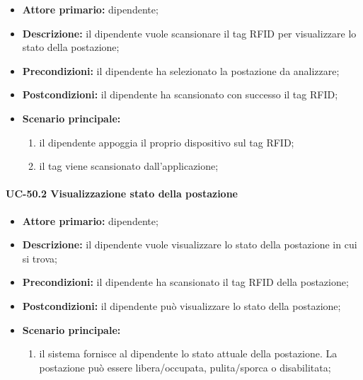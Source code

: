     \begin{itemize}
        \item \textbf{Attore primario:} dipendente;

        \item \textbf{Descrizione:} il dipendente vuole scansionare il tag RFID per visualizzare lo stato della postazione;

        \item \textbf{Precondizioni:} il dipendente ha selezionato la postazione da analizzare;

        \item \textbf{Postcondizioni:} il dipendente ha scansionato con successo il tag RFID;

        \item \textbf{Scenario principale:}
            \begin{enumerate}
                \item il dipendente appoggia il proprio dispositivo sul tag RFID;
                \item il tag viene scansionato dall'applicazione;
            \end{enumerate}
    \end{itemize}

\paragraph{UC-50.2 Visualizzazione stato della postazione}

\begin{itemize}
    \item \textbf{Attore primario:} dipendente;

    \item \textbf{Descrizione:} il dipendente vuole visualizzare lo stato della postazione in cui si trova;

    \item \textbf{Precondizioni:} il dipendente ha scansionato il tag RFID della postazione;

    \item \textbf{Postcondizioni:} il dipendente può visualizzare lo stato della postazione;

    \item \textbf{Scenario principale:}
        \begin{enumerate}
            \item il sistema fornisce al dipendente lo stato attuale della postazione. La postazione può essere libera/occupata, pulita/sporca o disabilitata;
        \end{enumerate}
\end{itemize}

